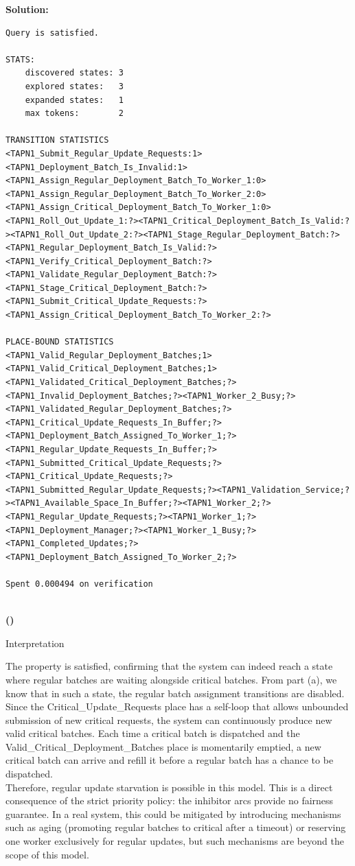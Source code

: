 \documentclass[10pt]{article}
\newenvironment{solution}{
	\vspace{1em}\par\large\textbf{{Solution:}}\par\vspace{1em}
}{
	\vspace{1em}
}
\newcounter{step}
\renewcommand{\thestep}{\Roman{step}}
\newenvironment{step}{
	\refstepcounter{step}
	\vspace{1.5em}\par\noindent\large\textbf{(\thestep)}
}{
	\par
	\vspace{1.5em}
}
\begin{document}
\begin{solution}
\begin{lstlisting}[style=queryoutput]
Query is satisfied.

STATS:
	discovered states: 3
	explored states:   3
	expanded states:   1
	max tokens:        2

TRANSITION STATISTICS
<TAPN1_Submit_Regular_Update_Requests:1><TAPN1_Deployment_Batch_Is_Invalid:1><TAPN1_Assign_Regular_Deployment_Batch_To_Worker_1:0><TAPN1_Assign_Regular_Deployment_Batch_To_Worker_2:0><TAPN1_Assign_Critical_Deployment_Batch_To_Worker_1:0><TAPN1_Roll_Out_Update_1:?><TAPN1_Critical_Deployment_Batch_Is_Valid:?><TAPN1_Roll_Out_Update_2:?><TAPN1_Stage_Regular_Deployment_Batch:?><TAPN1_Regular_Deployment_Batch_Is_Valid:?><TAPN1_Verify_Critical_Deployment_Batch:?><TAPN1_Validate_Regular_Deployment_Batch:?><TAPN1_Stage_Critical_Deployment_Batch:?><TAPN1_Submit_Critical_Update_Requests:?><TAPN1_Assign_Critical_Deployment_Batch_To_Worker_2:?>

PLACE-BOUND STATISTICS
<TAPN1_Valid_Regular_Deployment_Batches;1><TAPN1_Valid_Critical_Deployment_Batches;1><TAPN1_Validated_Critical_Deployment_Batches;?><TAPN1_Invalid_Deployment_Batches;?><TAPN1_Worker_2_Busy;?><TAPN1_Validated_Regular_Deployment_Batches;?><TAPN1_Critical_Update_Requests_In_Buffer;?><TAPN1_Deployment_Batch_Assigned_To_Worker_1;?><TAPN1_Regular_Update_Requests_In_Buffer;?><TAPN1_Submitted_Critical_Update_Requests;?><TAPN1_Critical_Update_Requests;?><TAPN1_Submitted_Regular_Update_Requests;?><TAPN1_Validation_Service;?><TAPN1_Available_Space_In_Buffer;?><TAPN1_Worker_2;?><TAPN1_Regular_Update_Requests;?><TAPN1_Worker_1;?><TAPN1_Deployment_Manager;?><TAPN1_Worker_1_Busy;?><TAPN1_Completed_Updates;?><TAPN1_Deployment_Batch_Assigned_To_Worker_2;?>

Spent 0.000494 on verification


	\end{lstlisting}

	\begin{step}
		Interpretation
	\end{step}

	The property is satisfied, confirming that the system can indeed reach a state where regular batches are waiting alongside critical batches. From part (a), we know that in such a state, the regular batch assignment transitions are disabled. Since the Critical\_Update\_Requests place has a self-loop that allows unbounded submission of new critical requests, the system can continuously produce new valid critical batches. Each time a critical batch is dispatched and the Valid\_Critical\_Deployment\_Batches place is momentarily emptied, a new critical batch can arrive and refill it before a regular batch has a chance to be dispatched. \\

	Therefore, regular update starvation is possible in this model. This is a direct consequence of the strict priority policy: the inhibitor arcs provide no fairness guarantee. In a real system, this could be mitigated by introducing mechanisms such as aging (promoting regular batches to critical after a timeout) or reserving one worker exclusively for regular updates, but such mechanisms are beyond the scope of this model.

\end{solution}
\end{document}
